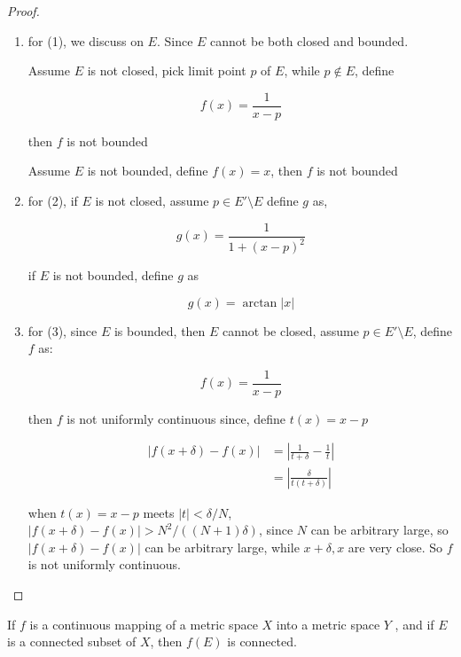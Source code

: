 \begin{proof}
    \begin{enumerate}
        \item for (1), we discuss on $E$. Since $E$ cannot be both closed and bounded.

        Assume $E$ is not closed, pick limit point $p$ of $E$, while $p \notin E$, define 

        \[
            f(x) = \frac{1}{x-p}
        \]

        then $f$ is not bounded


        Assume $E$ is not bounded, define $f(x) = x$, then $f$ is not bounded


        \item for (2), if $E$ is not closed, assume $p \in E' \setminus E$ define $g$ as, 

        \[
            g(x) = \frac{1}{1+ (x-p)^2}
        \]

        if $E$ is not bounded, define $g$ as

        \[
            g(x) = \arctan \lvert x \rvert
        \]

        \item for (3), since $E$ is bounded, then $E$ cannot be closed, assume $p \in E' \setminus E$, define $f$ as:

        \[
            f(x) = \frac{1}{x-p}
        \]

        then $f$ is not uniformly continuous since, define $t(x) = x-p$

        \begin{align*}
            \lvert f(x+\delta) -f(x) \rvert &= \left| \frac{1}{t+\delta} - \frac{1}{t} \right| \\
            &= \left|\frac{\delta}{t(t+\delta)} \right|
        \end{align*}

        when $t(x) = x-p $ meets $\lvert t \rvert < \delta / N$, $\lvert f(x+\delta) -f(x) \rvert > N^2/((N+1)\delta)$,
        since $N$ can be arbitrary large, so $\lvert f(x+\delta) -f(x) \rvert$ can be arbitrary large, while $x+\delta, x$ are very close.
        So $f$ is not uniformly continuous.
    \end{enumerate}
\end{proof}

\begin{thm}
    If $f$ is a continuous mapping of a metric space $X$ into a metric space $Y$
    , and if $E$ is a connected subset of $X$, then $f(E)$ is connected.
\end{thm}

